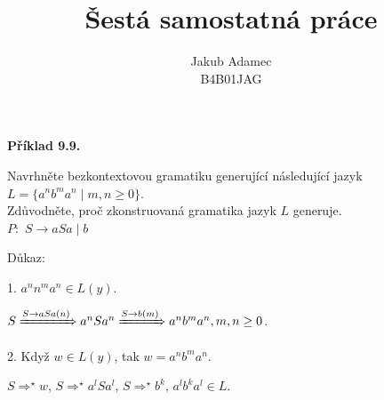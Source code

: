 \documentclass[11pt]{article}
\begin{document}

\newcommand\splitpage[2]{
      \begin{minipage}[t]{0.45\textwidth}#1
      \end{minipage}%
      \hfill
      \begin{minipage}[t]{0.45\textwidth}#2
      \end{minipage}
}
 
 
\title{\textbf{Šestá samostatná práce}}
\author{Jakub Adamec\\ %
B4B01JAG} %

\maketitle


\noindent
\textbf{Příklad 9.9.} 

Navrhněte bezkontextovou gramatiku generující následující jazyk ${L = \{a^n b^m a^n \mid m, n \geq 0\}}$.\\
Zdůvodněte, proč zkonstruovaná gramatika jazyk $L$ generuje.\\

$P: $
$S \rightarrow aSa \mid b$

Důkaz:
\\

\splitpage{

1. $a^n n^m a^n \in L(y)$.

${S \xRightarrow{S \rightarrow a S a (n)} a^n S a^n \xRightarrow{S \rightarrow b (m)} a^n b^m a^n, m,n \geq 0}$.
}{

2. Když $w \in L(y)$, tak $w = a^n b^m a^n$.

$S \Rightarrow^\star w$, $S \Rightarrow^\star a^l S a^l$, $S \Rightarrow^\star b^k$, $a^l b^k a^l \in L$.

}
\\
\\
\\
\end{document}
